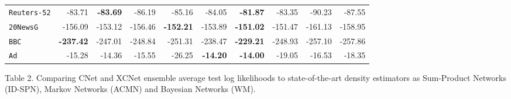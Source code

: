 \documentclass[final]{beamer}
\begin{document}
\begin{frame}{}
\begin{textblock}{17.5}
\begin{table}[t]
\begin{tabular}{l r r r r  r  r r r r}
    \texttt{Reuters-52} & -83.71                               & \textbf{-83.69}                                & -86.19                 & -85.16  & -84.05  & \textbf{-81.87}  & -83.35         & -90.23          & -87.55          \\ 
    \texttt{20NewsG}    & -156.09                              & -153.12                               & -156.46                & \textbf{-152.21} & -153.89 & \textbf{-151.02} & -151.47        & -161.13         & -158.95         \\ 
    \texttt{BBC}        & \textbf{-237.42}                              & -247.01                               & -248.84                & -251.31 & -238.47 & \textbf{-229.21} & -248.93        & -257.10         & -257.86         \\ 
    \texttt{Ad}         & -15.28                               & -14.36                                & -15.55                 & -26.25  & \textbf{-14.20}  & \textbf{-14.00}  & -19.05         & -16.53          & -18.35          \\ 
    \bottomrule
  \end{tabular}
  \label{tab:ll-ens}
\end{table}
\hspace{50pt}\begin{minipage}{0.8\linewidth}
 \scriptsize Table 2. Comparing CNet and XCNet ensemble average test
  log likelihoods to state-of-the-art density estimators as
  Sum-Product Networks (\textsf{ID-SPN}), Markov Networks
  (\textsf{ACMN}) and Bayesian Networks (\textsf{WM}). 
\end{minipage}


\end{textblock}
\end{frame}
\end{document}
